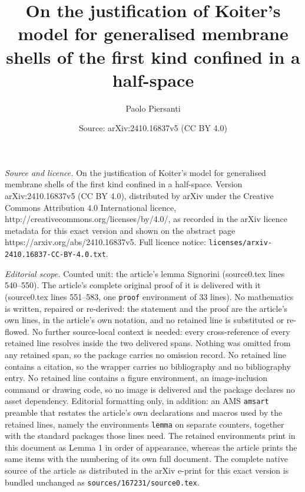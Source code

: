 \documentclass[10pt,a4paper]{amsart}
\title{On the justification of Koiter's model for generalised membrane shells of the first kind confined in a half-space}
\author{Paolo Piersanti}
\date{Source: arXiv:2410.16837v5 (CC BY 4.0)}
\begin{document}
\maketitle

\noindent\emph{Source and licence.} On the justification of Koiter's model for generalised membrane shells of the first kind confined in a half-space. Version arXiv:2410.16837v5 (CC BY 4.0), distributed by arXiv under the Creative Commons Attribution 4.0 International licence, http://creativecommons.org/licenses/by/4.0/, as recorded in the arXiv licence metadata for this exact version and shown on the abstract page https://arxiv.org/abs/2410.16837v5. Full licence notice: \texttt{licenses/arxiv-2410.16837-CC-BY-4.0.txt}.\par\smallskip

\noindent\textit{Editorial scope.} Counted unit: the article's lemma Signorini (source0.tex lines 540--550). The article's complete original proof of it is delivered with it (source0.tex lines 551--583, one \texttt{proof} environment of 33 lines). No mathematics is written, repaired or re-derived: the statement and the proof are the article's own lines, in the article's own notation, and no retained line is substituted or re-flowed.  No further source-local context is needed: every cross-reference of every retained line resolves inside the two delivered spans.  Nothing was omitted from any retained span, so the package carries no omission record.  No retained line contains a citation, so the wrapper carries no bibliography and no bibliography entry.  No retained line contains a figure environment, an image-inclusion command or drawing code, so no image is delivered and the package declares no asset dependency.  Editorial formatting only, in addition: an AMS \texttt{amsart} preamble that restates the article's own declarations and macros used by the retained lines, namely the environments \texttt{lemma} on separate counters, together with the standard packages those lines need.  The retained environments print in this document as Lemma 1 in order of appearance, whereas the article prints the same items with the numbering of its own full document.  The complete native source of the article as distributed in the arXiv e-print for this exact version is bundled unchanged as \texttt{sources/167231/source0.tex}.
\end{document}
